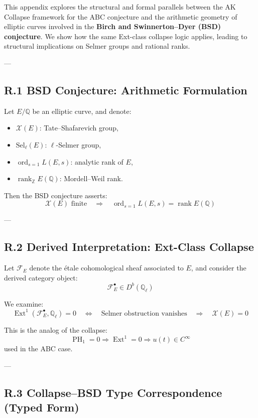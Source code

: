\documentclass[11pt]{article}
\DeclareMathOperator{\Ext}{Ext}
\DeclareMathOperator{\PH}{PH}
\newcommand{\Sha}{\mathcal{X}}
\begin{document}
This appendix explores the structural and formal parallels between the AK Collapse framework for the ABC conjecture  
and the arithmetic geometry of elliptic curves involved in the \textbf{Birch and Swinnerton–Dyer (BSD) conjecture}.  
We show how the same Ext-class collapse logic applies, leading to structural implications on Selmer groups  
and rational ranks.

---

\subsection*{R.1 BSD Conjecture: Arithmetic Formulation}

Let \( E/\mathbb{Q} \) be an elliptic curve, and denote:
\begin{itemize}
  \item \( \Sha(E) \): Tate–Shafarevich group,
  \item \( \mathrm{Sel}_\ell(E) \): \( \ell \)-Selmer group,
  \item \( \operatorname{ord}_{s=1} L(E,s) \): analytic rank of \( E \),
  \item \( \operatorname{rank}_{\mathbb{Z}} E(\mathbb{Q}) \): Mordell–Weil rank.
\end{itemize}

Then the BSD conjecture asserts:
\[
\boxed{
\Sha(E) \text{ finite} \quad \Rightarrow \quad \operatorname{ord}_{s=1} L(E,s) = \operatorname{rank} E(\mathbb{Q})
}
\]

---

\subsection*{R.2 Derived Interpretation: Ext-Class Collapse}

Let \( \mathcal{F}_E \) denote the étale cohomological sheaf associated to \( E \), and consider the derived category object:
\[
\mathcal{F}_E^\bullet \in D^b(\mathbb{Q}_\ell)
\]

We examine:
\[
\Ext^1(\mathcal{F}_E^\bullet, \mathbb{Q}_\ell) = 0
\quad \Leftrightarrow \quad \text{Selmer obstruction vanishes} \quad \Rightarrow \quad \Sha(E) = 0
\]

This is the analog of the collapse:
\[
\PH_1 = 0 \Rightarrow \Ext^1 = 0 \Rightarrow u(t) \in C^\infty
\]
used in the ABC case.

---

\subsection*{R.3 Collapse–BSD Type Correspondence (Typed Form)}
\end{document}
